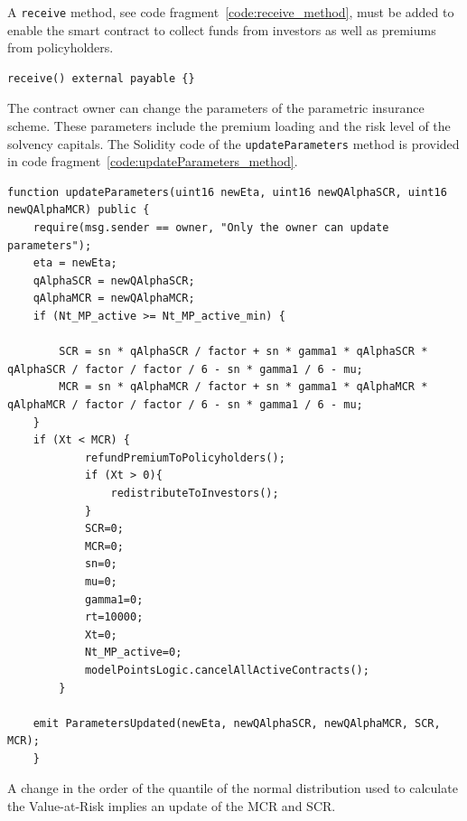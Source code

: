 \documentclass[10pt]{article}
\begin{document}
A \texttt{receive} method, see code fragment~\ref{code:receive_method}, must be added to enable the smart contract to collect funds from investors as well as premiums from policyholders.


\begin{codefragment}[!h]
\begin{lstlisting}[language=Solidity]
receive() external payable {}
    \end{lstlisting}
    \caption{Receive method of \texttt{InsuranceLogic}}
    \label{code:receive_method}
\end{codefragment}

The contract owner can change the parameters of the parametric insurance scheme. These parameters include the premium loading and the risk level of the solvency capitals. The Solidity code of the \texttt{updateParameters} method is provided in code fragment~\ref{code:updateParameters_method}.


\begin{codefragment}[!h]
\begin{lstlisting}[language=Solidity]
function updateParameters(uint16 newEta, uint16 newQAlphaSCR, uint16 newQAlphaMCR) public {
    require(msg.sender == owner, "Only the owner can update parameters");
    eta = newEta;
    qAlphaSCR = newQAlphaSCR;
    qAlphaMCR = newQAlphaMCR;
    if (Nt_MP_active >= Nt_MP_active_min) {

        SCR = sn * qAlphaSCR / factor + sn * gamma1 * qAlphaSCR * qAlphaSCR / factor / factor / 6 - sn * gamma1 / 6 - mu;
        MCR = sn * qAlphaMCR / factor + sn * gamma1 * qAlphaMCR * qAlphaMCR / factor / factor / 6 - sn * gamma1 / 6 - mu;
    }
    if (Xt < MCR) {
            refundPremiumToPolicyholders();
            if (Xt > 0){
                redistributeToInvestors();
            }
            SCR=0;
            MCR=0;
            sn=0;
            mu=0;
            gamma1=0;
            rt=10000;
            Xt=0;
            Nt_MP_active=0;
            modelPointsLogic.cancelAllActiveContracts();
        }

    emit ParametersUpdated(newEta, newQAlphaSCR, newQAlphaMCR, SCR, MCR);
    }
        \end{lstlisting}
    \caption{updateParameters method of \texttt{InsuranceLogic}}
    \label{code:updateParameters_method}
\end{codefragment}

A change in the order of the quantile of the normal distribution used to calculate the Value-at-Risk implies an update of the MCR and SCR.
\end{document}

